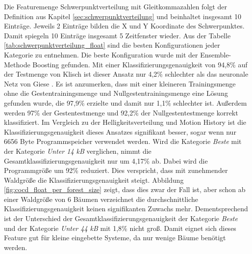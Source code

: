 Die Featuremenge Schwerpunktverteilung mit Gleitkommazahlen folgt der Definition aus Kapitel \ref{sec:schwerpunktverteilung} und beinhaltet insgesamt 10 Einträge. Jeweils 2 Einträge bilden die X und Y
Koordinate des Schwerpunktes. Damit spiegeln 10 Einträge insgesamt 5 Zeitfenster wieder.
\newline
\newline
Aus der Tabelle \ref{tab:schwerpunktverteilung_float} sind die besten Konfigurationen jeder Kategorie zu entnehmen. Die beste Konfiguration wurde mit der Ensemble-Methode Boosting gefunden.
Mit einer Klassifizierungsgenauigkeit von 94,8\% auf der Testmenge von Klisch ist dieser Ansatz nur 4,2\% schlechter als das neuronale Netz von Giese \cite{gieseThesis}. Es ist anzumerken, dass mit einer
kleineren Trainingsmenge ohne die Gestentrainingsmenge und Nullgestentrainingsmenge eine Lösung gefunden wurde, die 97,9\% erzielte und damit nur 1,1\% schlechter ist.
Außerdem werden 97\% der Gestentestmenge und 92,2\% der Nullgestentestmenge korrekt klassifiziert.
\newline
\newline
Im Vergleich zu der Helligkeitsverteilung und Motion History ist die Klassifizierungsgenauigkeit dieses Ansatzes signifikant besser, sogar wenn nur 6656 Byte Programmspeicher verwendet werden.
Wird die Kategorie \textit{Beste} mit der Kategorie \textit{Unter 14 kB} verglichen, nimmt die Gesamtklassifizierungsgenauigkeit nur um 4,17\% ab. Dabei wird die Programmgröße um 92\% reduziert.
Dies verspricht, dass mit zunehmender Waldgröße die Klassifizierungsgenauigkeit steigt. Abbildung \ref{fig:cocd_float_per_forest_size} zeigt, dass dies zwar der Fall ist, aber schon ab einer Waldgröße von 6
Bäumen verzeichnet die durchschnittliche Klassifizierungsgenauigkeit keinen signifikanten Zuwachs mehr. Dementsprechend ist der Unterschied der Gesamtklassifizierungsgenauigkeit der Kategorie \textit{Beste}
und der Kategorie \textit{Unter 44 kB} mit 1,8\% nicht groß. Damit eignet sich dieses Feature gut für kleine eingebette Systeme, da nur wenige Bäume benötigt werden.